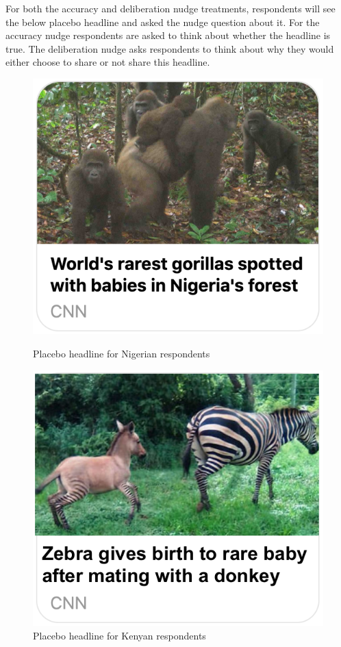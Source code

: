 \documentclass[letterpaper, 12pt, parskip=full,DIV=10]{scrartcl}
\begin{document}
For both the accuracy and deliberation nudge treatments, respondents will see the below placebo headline and asked the nudge question about it. For the accuracy nudge respondents are asked to think about whether the headline is true. The deliberation nudge asks respondents to think about why they would either choose to share or not share this headline.

\begin{figure}[htb]
\centering
    \begin{minipage}{0.45\textwidth}
        \centering
        \includegraphics[width=\textwidth]{figures/placebo_ng.png} 
        \caption{Placebo headline for Nigerian respondents}
    \end{minipage}\hfill
    \begin{minipage}{0.45\textwidth}
        \centering
        \includegraphics[width=\textwidth]{figures/placebo_ky.png} 
        \caption{Placebo headline for Kenyan respondents}
    \end{minipage}
\end{figure} 
\end{document}
